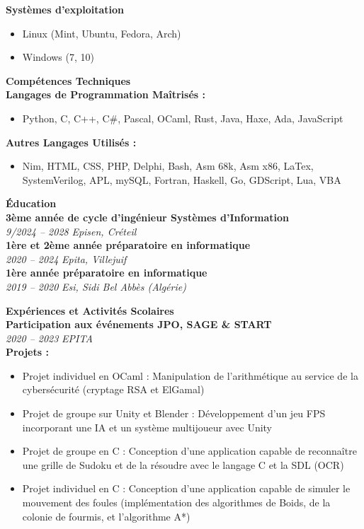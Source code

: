 \documentclass[a4paper,11pt]{article} %
\newcommand{\cvsection}[1]{\vspace{1em}\noindent\textbf{\textcolor{cvhighlight}{\LARGE #1}}\vspace{0.5em}\\}
\newcommand{\cvevent}[3]{\textbf{#1} \\ \textit{#2} \hfill \textit{#3} \vspace{0.5em}}
\newcommand{\cvitem}[1]{\item #1}
\begin{document}
\begin{paracol}{2}
\colorbox{sectionbg1}{
    \parbox{\linewidth}{
        \cvsection{\faDesktop \hspace{0em} Systèmes d'exploitation}
        \vspace{-1em}
        \begin{itemize}[leftmargin=0.5cm, itemsep=0pt, topsep=0pt]
            \cvitem{Linux (Mint, Ubuntu, Fedora, Arch)}
            \cvitem{Windows (7, 10)}
        \end{itemize}
    }
}
\medskip

\colorbox{sectionbg2}{
    \parbox{\linewidth}{
        \cvsection{\faCode \hspace{0.5em} Compétences Techniques}
        \textbf{Langages de Programmation Maîtrisés :}
        \begin{itemize}[leftmargin=0.5cm, itemsep=0pt, topsep=0pt]
            \cvitem{Python, C, C++, C\#, Pascal, OCaml, Rust, Java, Haxe, Ada, JavaScript}
        \end{itemize}
        \textbf{Autres Langages Utilisés :}
        \begin{itemize}[leftmargin=0.5cm, itemsep=0pt, topsep=0pt]
            \cvitem{Nim, HTML, CSS, PHP, Delphi, Bash, Asm 68k, Asm x86, LaTex, SystemVerilog, APL, mySQL, Fortran, Haskell, Go, GDScript, Lua, VBA}
        \end{itemize}
    }
}
\medskip

\switchcolumn

\colorbox{sectionbg1}{
    \parbox{\linewidth}{
        \cvsection{\faGraduationCap \hspace{0.5em} Éducation}
        \cvevent{3ème année de cycle d'ingénieur Systèmes d’Information}{9/2024 – 2028}{Episen, Créteil} \\
        \cvevent{1ère et 2ème année préparatoire en informatique}{2020 – 2024}{Epita, Villejuif} \\
        \cvevent{1ère année préparatoire en informatique}{2019 – 2020}{Esi, Sidi Bel Abbès (Algérie)}
    }
}
\medskip

\colorbox{sectionbg2}{
    \parbox{\linewidth}{
        \cvsection{\faBriefcase \hspace{0.5em} Expériences et Activités Scolaires}
        \cvevent{Participation aux événements JPO, SAGE \& START}{2020 – 2023}{EPITA} \\
        \textbf{Projets :}
        \begin{itemize}[leftmargin=0.5cm, itemsep=0pt, topsep=0pt]
            \cvitem{Projet individuel en OCaml : Manipulation de l'arithmétique au service de la cybersécurité (cryptage RSA et ElGamal)}
            \cvitem{Projet de groupe sur Unity et Blender : Développement d'un jeu FPS incorporant une IA et un système multijoueur avec Unity}
            \cvitem{Projet de groupe en C : Conception d'une application capable de reconnaître une grille de Sudoku et de la résoudre avec le langage C et la SDL (OCR)}
            \cvitem{Projet individuel en C : Conception d'une application capable de simuler le mouvement des foules (implémentation des algorithmes de Boids, de la colonie de fourmis, et l'algorithme A*)}
        \end{itemize}
    }
}
\medskip


\end{paracol}
\end{document}
